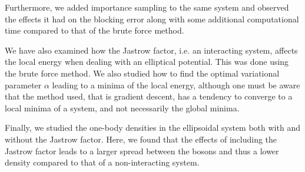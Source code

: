 \documentclass[
    a4paper, aps, twocolumn, floatfix, superscriptaddress,
    nofootinbib]{revtex4-1}
\begin{document}
Furthermore, we added importance sampling to the same system and observed the effects it had on the blocking error along with some additional computational time compared to that of the brute force method.

We have also examined how the Jastrow factor, i.e. an interacting system, affects the local energy when dealing with an elliptical potential. This was done using the brute force method. We also studied how to find the optimal variational parameter $\alpha$ leading to a minima of the local energy, although one must be aware that the method used, that is gradient descent, has a tendency to converge to a local minima of a system, and not necessarily the global minima.

Finally, we studied the one-body densities in the ellipsoidal system both with and without the Jastrow factor. Here, we found that the effects of including the Jastrow factor leads to a larger spread between the bosons and thus a lower density compared to that of a non-interacting system.


\end{document}
